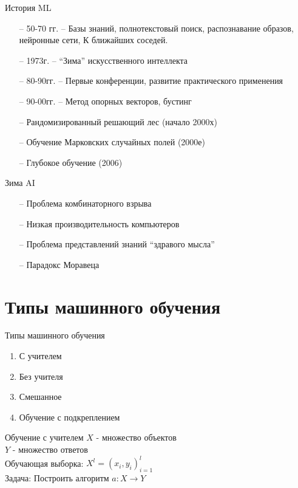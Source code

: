 \documentclass[10pt]{beamer}
\begin{document}
\begin{frame}{История ML}
	\begin{itemize} [<+->]
	  \item[--] 50-70 гг. -- Базы знаний, полнотекстовый поиск, распознавание образов, нейронные сети, К ближайших соседей.
	  \item[--] 1973г. -- “Зима” искусственного интеллекта
	  \item[--] 80-90гг.  -- Первые конференции, развитие практического применения
	  \item[--] 90-00гг. -- Метод опорных векторов, бустинг
	  \item[--] Рандомизированный решающий лес (начало 2000х)
	  \item[--] Обучение Марковских случайных полей (2000е)
	  \item[--] Глубокое обучение (2006)
	\end{itemize}
\end{frame}

\begin{frame}{Зима AI}
	\begin{itemize} [<+->]
	  \item[--] Проблема комбинаторного взрыва
	  \item[--] Низкая производительность компьютеров
	  \item[--] Проблема представлений знаний “здравого мысла”
	  \item[--] Парадокс Моравеца
	\end{itemize}
\end{frame}

\section{Типы машинного обучения}

\begin{frame}{Типы машинного обучения}
	\begin{enumerate}
	  \item С учителем
	  \item Без учителя
	  \item Смешанное
	  \item Обучение с подкреплением
	\end{enumerate}
\end{frame}

{
\begin{frame}{Обучение с учителем}
  	$X$ - множество объектов \\
	$Y$ - множество ответов \\
	Обучающая выборка: ${X^l = (x_i, y_i)_{i=1}^l}$ \\  
	\bigbreak
	\bigbreak
	\alert{Задача}: Построить алгоритм ${a \colon X \rightarrow Y}$
\end{frame}
}
\end{document}

